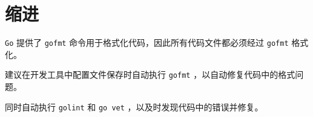 \chapter{缩进}
\texttt{Go} 提供了 \texttt{gofmt} 命令用于格式化代码，因此所有代码文件都必须经过 \texttt{gofmt} 格式化。

建议在开发工具中配置文件保存时自动执行 \texttt{gofmt} ，以自动修复代码中的格式问题。

同时自动执行 \texttt{golint} 和 \texttt{go vet} ，以及时发现代码中的错误并修复。
